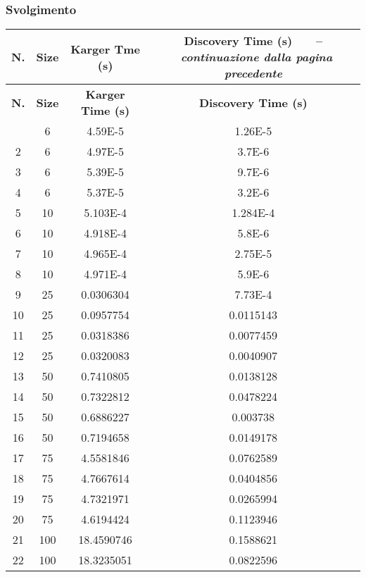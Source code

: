 \subsubsection{Svolgimento}

\begin{center}
	\begin{longtable}{|c|c|c|c|}	
		\hline
		\textbf{N.} & \textbf{Size} & \textbf{Karger Tme (s)} & \textbf{Discovery Time (s)}
		\endfirsthead
		{\tablename\ \thetable\ \ --\  \textit{continuazione dalla pagina precedente}} \\
		\hline
		\textbf{N.} & \textbf{Size} & \textbf{Karger Time (s)} & \textbf{Discovery Time (s)}
		\endhead
		\hline {\textit{Continua nella pagina seguente}} \\
		\endfoot  
		\endlastfoot
		\hline
		1 & 6 & 4.59E-5	 & 1.26E-5 \\			    
		2 & 6 & 4.97E-5	 & 3.7E-6 \\			   	
		3 & 6 & 5.39E-5	 & 9.7E-6 \\		   		
		4 & 6 & 5.37E-5	 & 3.2E-6 \\			    
		5 & 10 & 5.103E-4 & 1.284E-4 \\	   		
		6 & 10 & 4.918E-4 & 5.8E-6 \\			  	
		7 & 10 & 4.965E-4 & 2.75E-5 \\			    
		8 & 10 & 4.971E-4 & 5.9E-6 \\			   	
		9 & 25 & 0.0306304 & 7.73E-4 \\
		10 & 25 & 0.0957754 & 0.0115143 \\		   	
		11 & 25 & 0.0318386 & 0.0077459 \\			
		12 & 25 & 0.0320083 & 0.0040907 \\	  		
		13 & 50 & 0.7410805 & 0.0138128 \\		    
		14 & 50 & 0.7322812 & 0.0478224 \\	    	
		15 & 50 & 0.6886227 & 0.003738 \\	  		
		16 & 50 & 0.7194658 & 0.0149178 \\	        
		17 & 75 & 4.5581846 & 0.0762589 \\	   		
		18 & 75 & 4.7667614 & 0.0404856 \\	  		
		19 & 75 & 4.7321971 & 0.0265994 \\	   		
		20 & 75 & 4.6194424 & 0.1123946 \\		  	
		21 & 100 & 18.4590746 & 0.1588621 \\	 
		22 & 100 & 18.3235051 & 0.0822596 \\	 

\end{longtable}
\end{center}
